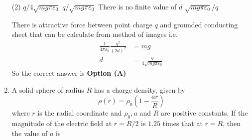 \begin{enumerate}[label=\color{ocre}\textbf{\arabic*.}]
\begin{tasks}(2)
\task[\textbf{A.}] $q / 4 \sqrt{m g \pi \varepsilon_{0}}$
\task[\textbf{B.}] $q / \sqrt{m g \pi \varepsilon_{0}}$
\task[\textbf{C.}] There is no finite value of $d$
\task[\textbf{D.}]  $\sqrt{m g \pi \varepsilon_{0}} / q$
\end{tasks}
\begin{answer}
There is attractive force between point charge $q$ and grounded conducting sheet that can be calculate from method of images i.e.
\begin{align*}
\frac{1}{4 \pi \varepsilon_{0}} \frac{q^{2}}{(2 d)^{2}}&=m g \\ d&=\frac{q}{4 \sqrt{m g \pi \varepsilon_{0}}}
\end{align*} 
So the correct answer is \textbf{Option (A)}
\end{answer}
\item A solid sphere of radius $R$ has a charge density, given by
$$
\rho(r)=\rho_{0}\left(1-\frac{a r}{R}\right)
$$
where $r$ is the radial coordinate and $\rho_{0}, a$ and $R$ are positive constants. If the magnitude of the electric field at $r=R / 2$ is $1.25$ times that at $r=R$, then the value of $a$ is
{}


\end{enumerate}
